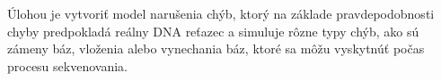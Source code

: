 Úlohou je vytvoriť model narušenia chýb, ktorý na základe pravdepodobnosti chyby predpokladá reálny DNA reťazec a simuluje rôzne typy chýb, ako sú zámeny báz, vloženia alebo vynechania báz, ktoré sa môžu vyskytnúť počas procesu sekvenovania.